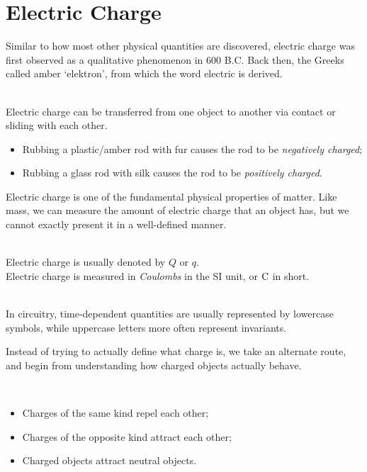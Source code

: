 \section{Electric Charge}
Similar to how most other physical quantities are discovered, electric charge was first observed as a qualitative phenomenon in 600 B.C. Back then, the Greeks called amber `elektron', from which the word electric is derived.
\begin{property}
    \ \\Electric charge can be transferred from one object to another via contact or sliding with each other.
    \begin{itemize}
        \item Rubbing a plastic/amber rod with fur causes the rod to be \emph{negatively charged};
        \item Rubbing a glass rod with silk causes the rod to be \emph{positively charged}. 
    \end{itemize}
    \label{property-triboelectric-effect}
\end{property}
Electric charge is one of the fundamental physical properties of matter. Like mass, we can measure the amount of electric charge that an object has, but we cannot exactly present it in a well-defined manner. 
\begin{notation}
    \ \\Electric charge is usually denoted by $Q$ or $q$.\\
    Electric charge is measured in \emph{Coulombs} in the SI unit, or $\rm{C}$ in short.
\end{notation}
\vspace{-12pt}
\begin{remark}
    \ \\In circuitry, time-dependent quantities are usually represented by lowercase symbols, while uppercase letters more often represent invariants.
\end{remark}
Instead of trying to actually define what charge is, we take an alternate route, and begin from understanding how charged objects actually behave.
\begin{property}
    \ \begin{itemize}
        \item Charges of the same kind repel each other;
        \item Charges of the opposite kind attract each other;
        \item Charged objects attract neutral objects.
    \end{itemize}
    \label{ppt: attract and repel}
\end{property}
